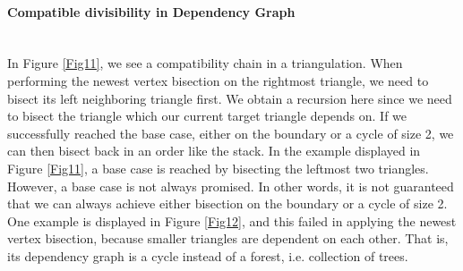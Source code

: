     \paragraph{Compatible divisibility in Dependency Graph}\mbox{}\\
    In Figure \ref{Fig11}, we see a compatibility chain in a triangulation. When performing the newest vertex bisection on the rightmost triangle, we need to bisect its left neighboring triangle first. We obtain a recursion here since we need to bisect the triangle which our current target triangle depends on. If we successfully reached the base case, either on the boundary or a cycle of size 2, we can then bisect back in an order like the stack. In the example displayed in Figure \ref{Fig11}, a base case is reached by bisecting the leftmost two triangles. However, a base case is not always promised. In other words, it is not guaranteed that we can always achieve either bisection on the boundary or a cycle of size 2. One example is displayed in Figure \ref{Fig12}, and this failed in applying the newest vertex bisection, because smaller triangles are dependent on each other. That is, its dependency graph is a cycle instead of a forest, i.e. collection of trees.

